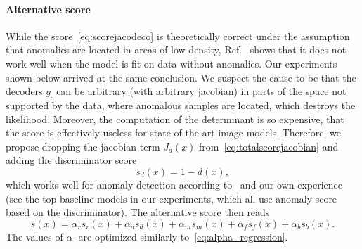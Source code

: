 \paragraph{Alternative score} While the score~\eqref{eq:scorejacodeco} is theoretically correct under the assumption that anomalies are located in areas of low density, Ref.~\cite{vsmidl2019anomaly} shows that it does not work well when the model is fit on data without anomalies. Our experiments shown below arrived at the same conclusion. We suspect the cause to be that the decoders $g_\cdot$ can be arbitrary (with arbitrary jacobian) in parts of the space not supported by the data, where anomalous samples are located, which destroys the likelihood. Moreover, the computation of the determinant is so expensive, that the score is effectively useless for state-of-the-art image models. Therefore, we propose dropping the jacobian term $J_d(x)$ from~\eqref{eq:totalscorejacobian} and adding the discriminator score
\begin{equation} \label{eq:discscore}
    s_d(x) = 1 - d(x),
\end{equation}
which works well for anomaly detection according to~\cite{larsen2016autoencoding} and our own  experience (see the top baseline models in our experiments, which all use anomaly score based on the discriminator). The alternative score then reads
\begin{equation} \label{eq:totalscoredisc}
    s(x) = \alpha_{r}  s_{r}(x) + \alpha_d s_d(x) + \alpha_m s_{m}(x) + \alpha_f s_{f}(x) + \alpha_b s_{b}(x).
\end{equation}
The values of $\alpha_{\cdot}$ are optimized similarly to~\eqref{eq:alpha_regression}.

